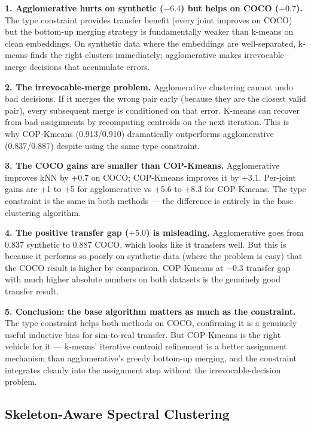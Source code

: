 \textbf{1. Agglomerative hurts on synthetic ($-6.4$) but helps on COCO ($+0.7$).} The type constraint provides transfer benefit (every joint improves on COCO) but the bottom-up merging strategy is fundamentally weaker than k-means on clean embeddings. On synthetic data where the embeddings are well-separated, k-means finds the right clusters immediately; agglomerative makes irrevocable merge decisions that accumulate errors.

\textbf{2. The irrevocable-merge problem.} Agglomerative clustering cannot undo bad decisions. If it merges the wrong pair early (because they are the closest valid pair), every subsequent merge is conditioned on that error. K-means can recover from bad assignments by recomputing centroids on the next iteration. This is why COP-Kmeans (0.913/0.910) dramatically outperforms agglomerative (0.837/0.887) despite using the same type constraint.

\textbf{3. The COCO gains are smaller than COP-Kmeans.} Agglomerative improves kNN by +0.7 on COCO; COP-Kmeans improves it by +3.1. Per-joint gains are +1 to +5 for agglomerative vs +5.6 to +8.3 for COP-Kmeans. The type constraint is the same in both methods --- the difference is entirely in the base clustering algorithm.

\textbf{4. The positive transfer gap ($+5.0$) is misleading.} Agglomerative goes from 0.837 synthetic to 0.887 COCO, which looks like it transfers well. But this is because it performs so poorly on synthetic data (where the problem is easy) that the COCO result is higher by comparison. COP-Kmeans at $-0.3$ transfer gap with much higher absolute numbers on both datasets is the genuinely good transfer result.

\textbf{5. Conclusion: the base algorithm matters as much as the constraint.} The type constraint helps both methods on COCO, confirming it is a genuinely useful inductive bias for sim-to-real transfer. But COP-Kmeans is the right vehicle for it --- k-means' iterative centroid refinement is a better assignment mechanism than agglomerative's greedy bottom-up merging, and the constraint integrates cleanly into the assignment step without the irrevocable-decision problem.


\subsection{Skeleton-Aware Spectral Clustering}

